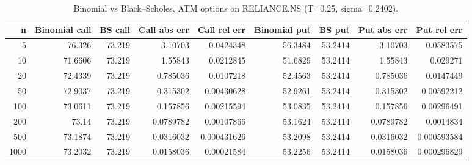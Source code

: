\begin{table}
\centering
\small
\caption{Binomial vs Black--Scholes, ATM options on RELIANCE.NS (T=0.25, sigma=0.2402).}
\label{tab:e1_convergence}
\begin{adjustbox}{max width=\textwidth}
\begin{tabular}{rrrrrrrrr}
\toprule
n & Binomial call & BS call & Call abs err & Call rel err & Binomial put & BS put & Put abs err & Put rel err \\
\midrule
5 & 76.326 & 73.219 & 3.10703 & 0.0424348 & 56.3484 & 53.2414 & 3.10703 & 0.0583575 \\
10 & 71.6606 & 73.219 & 1.55843 & 0.0212845 & 51.6829 & 53.2414 & 1.55843 & 0.029271 \\
20 & 72.4339 & 73.219 & 0.785036 & 0.0107218 & 52.4563 & 53.2414 & 0.785036 & 0.0147449 \\
50 & 72.9037 & 73.219 & 0.315302 & 0.00430628 & 52.9261 & 53.2414 & 0.315302 & 0.00592212 \\
100 & 73.0611 & 73.219 & 0.157856 & 0.00215594 & 53.0835 & 53.2414 & 0.157856 & 0.00296491 \\
200 & 73.14 & 73.219 & 0.0789782 & 0.00107866 & 53.1624 & 53.2414 & 0.0789782 & 0.0014834 \\
500 & 73.1874 & 73.219 & 0.0316032 & 0.000431626 & 53.2098 & 53.2414 & 0.0316032 & 0.000593584 \\
1000 & 73.2032 & 73.219 & 0.0158036 & 0.00021584 & 53.2256 & 53.2414 & 0.0158036 & 0.000296829 \\
\bottomrule
\end{tabular}
\end{adjustbox}
\end{table}
